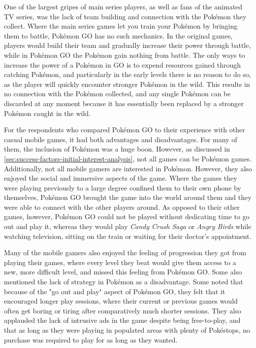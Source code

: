 One of the largest gripes of main series players, as well as fans of the animated TV series, was the lack of team building and connection with the Pokémon they collect. Where the main series games let you train your Pokémon by bringing them to battle, Pokémon GO has no such mechanics. In the original games, players would build their team and gradually increase their power through battle, while in Pokémon GO the Pokémon gain nothing from battle. The only ways to increase the power of a Pokémon in GO is to expend resources gained through catching Pokémon, and particularly in the early levels there is no reason to do so, as the player will quickly encounter stronger Pokémon in the wild. This results in no connection with the Pokémon collected, and any single Pokémon can be discarded at any moment because it has essentially been replaced by a stronger Pokémon caught in the wild.

For the respondents who compared Pokémon GO to their experience with other casual mobile games, it had both advantages and disadvantages. For many of them, the inclusion of Pokémon was a huge boon. However, as discussed in \ref{sec:success-factors-initial-interest-analysis}, not all games can be Pokémon games. Additionally, not all mobile gamers are interested in Pokémon. However, they also enjoyed the social and immersive aspects of the game. Where the games they were playing previously to a large degree confined them to their own phone by themselves, Pokémon GO brought the game into the world around them and they were able to connect with the other players around. As opposed to their other games, however, Pokémon GO could not be played without dedicating time to go out and play it, whereas they would play \emph{Candy Crush Saga} or \emph{Angry Birds} while watching television, sitting on the train or waiting for their doctor's appointment.

Many of the mobile gamers also enjoyed the feeling of progression they got from playing their games, where every level they beat would give them access to a new, more difficult level, and missed this feeling from Pokémon GO. Some also mentioned the lack of strategy in Pokémon as a disadvantage. Some noted that because of the "go out and play" aspect of Pokémon GO, they felt that it encouraged longer play sessions, where their current or previous games would often get boring or tiring after comparatively much shorter sessions. They also applauded the lack of intrusive ads in the game despite being free-to-play, and that as long as they were playing in populated areas with plenty of Pokéstops, no purchase was required to play for as long as they wanted.

